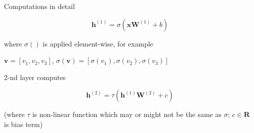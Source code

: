 \documentclass[12pt]{beamer}
\begin{document}
%
%
%
%
%
%
%
%
%


\begin{frame}{Computations in detail}


$$
\mathbf{h}^{(1)} = \sigma(\mathbf{x} \mathbf{W}^{(1)} + b)
$$
	
	where $\sigma()$ is applied element-wise, for example

	 $\mathbf{v} = [v_1, v_2, v_3]$, $\sigma(\mathbf{v}) = [\sigma(v_1), \sigma(v_2), \sigma(v_3)]$
	 
2-nd layer computes

$$
\mathbf{h}^{(2)} = \tau(\mathbf{h}^{(1)} \mathbf{W}^{(2)} + c)
$$

(where $\tau$ is non-linear function which may or might not be the same as $\sigma$; $c \in \mathbf{R}$ is bias term)
	
\end{frame}
\end{document}
